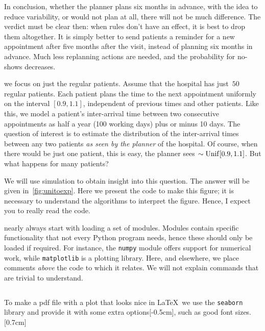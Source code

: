 \documentclass[stochastic-or.tex]{subfiles}
\begin{document}
In conclusion, whether the planner plans six months in advance, with the idea to reduce variability, or would not plan at all, there will not be much difference.
The verdict must be clear then: when rules don't have an effect, it is best to drop them altogether.
It is simply better to send patients a reminder for a new appointment after five months after the visit, instead of planning six months in advance.
Much less replanning actions are needed, and the probability for no-shows decreases.


 we focus on just the regular patients.
Assume that the hospital has just~$50$ regular patients.
Each patient plans the time to the next appointment uniformly on the interval $[0.9 , 1.1]$, independent of previous times and other patients.
Like this, we model a patient's inter-arrival time between two consecutive appointments as  half a year (100 working days) plus or minus 10 days.
The question of interest is to estimate the distribution of the inter-arrival times between any two patients \emph{as seen by the planner} of the hospital.
Of course, when there would be just one patient, this is easy, the planner sees $\sim \mathrm{Unif}[0.9, 1.1]$. But what happens for many patients?

We will use simulation to obtain insight into this question.
The answer will be given in~\cref{fig:unitoexp}.
Here we present the code to make this figure; it is necessary to understand the algorithms to interpret the figure.
Hence, I expect you to really read the code.

 nearly always start with loading a set of modules.
Modules contain specific functionality that not every Python program needs, hence these should only be loaded if required.
For instance, the \texttt{numpy} module offers support for numerical work, while \texttt{matplotlib} is a plotting library.
Here, and elsewhere, we place comments \emph{above} the code to which it relates.
We will not explain commands that are trivial to understand.

\inputminted[firstline=2, lastline=3]{python}{../code/IBD_simulations.py} %

To make a pdf file with a plot that looks nice in \LaTeX\, we  use the \texttt{seaborn} library and provide it with some extra options[-0.5cm], such as good font sizes.[0.7cm]
\inputminted[firstline=9, lastline=24]{python}{../code/IBD_simulations.py} %
\end{document}
